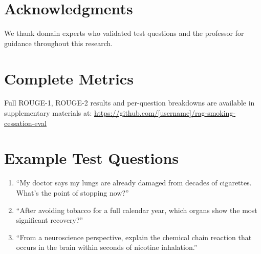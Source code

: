 \documentclass[11pt]{article}
\begin{document}
\section*{Acknowledgments}

We thank domain experts who validated test questions and the professor for guidance throughout this research.




\appendix

\section{Complete Metrics}

Full ROUGE-1, ROUGE-2 results and per-question breakdowns are available in supplementary materials at: \url{https://github.com/[username]/rag-smoking-cessation-eval}

\section{Example Test Questions}

\begin{enumerate}
    \item ``My doctor says my lungs are already damaged from decades of cigarettes. What's the point of stopping now?''
    \item ``After avoiding tobacco for a full calendar year, which organs show the most significant recovery?''
    \item ``From a neuroscience perspective, explain the chemical chain reaction that occurs in the brain within seconds of nicotine inhalation.''
\end{enumerate}
\end{document}
